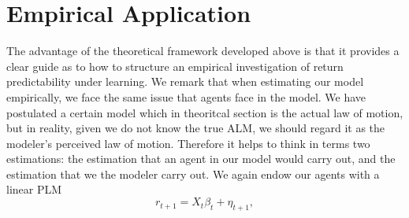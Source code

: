 \documentclass[11pt]{article}
\begin{document}
\section{Empirical Application}

The advantage of the theoretical framework developed above is that it provides a clear guide as to how to structure an empirical investigation of return predictability under learning.
We remark that when estimating our model empirically, we face the same issue that agents face in the model.
We have postulated a certain model which in theoritcal section is the actual law of motion, but in reality, given we do not know the 
true ALM, we should regard it as the modeler's perceived law of motion.
Therefore it helps to think in terms two estimations: the estimation that an agent in our model would carry out, and the estimation that we the modeler carry out.
We again endow our agents with a linear PLM
\begin{equation}
    r_{t+1} = X_t \beta_t + \eta_{t+1},
\end{equation} 
\end{document}
